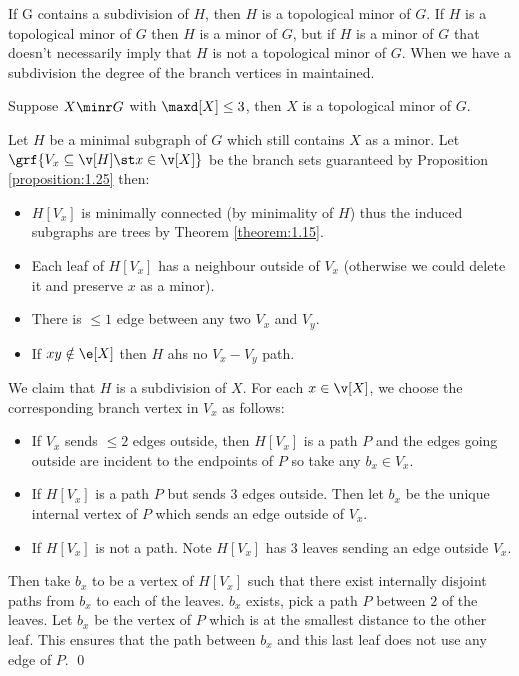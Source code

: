 If G contains a subdivision of $H$, then $H$ is a topological minor of $G$. If $H$ is a topological minor of $G$ then $H$ is a minor of $G$, but if $H$ is a minor of $G$ that doesn't necessarily imply that $H$ is not a topological minor of $G$. When we have a subdivision the degree of the branch vertices in maintained.
\begin{customproposition}{1.27}
    \label{proposition:1.27}
    Suppose $X \minr G$ with $\maxd[X] \leq 3$, then $X$ is a topological minor of $G$.
\end{customproposition}
\begin{prf}
    Let $H$ be a minimal subgraph of $G$ which still contains $X$ as a minor. Let $\grf{V_x \subseteq \v[H] \st x \in \v[X]}$ be the branch sets guaranteed by Proposition \ref{proposition:1.25} then:
    \begin{itemize}
        \item $H[V_x]$ is minimally connected (by minimality of $H$) thus the induced subgraphs are trees by Theorem \ref{theorem:1.15}.
        \item Each leaf of $H[V_x]$ has a neighbour outside of $V_x$ (otherwise we could delete it and preserve $x$ as a minor).
        \item There is $\leq 1$ edge between any two $V_x$ and $V_y$.
        \item If $xy \notin \e[X]$ then $H$ ahs no $V_x - V_y$ path.
    \end{itemize}
    We claim that $H$ is a subdivision of $X$. For each $x \in \v[X]$, we choose the corresponding branch vertex in $V_x$ as follows:
    \begin{itemize}
        \item If $V_x$ sends $\leq 2$ edges outside, then $H[V_x]$ is a path $P$ and the edges going outside are incident to the endpoints of $P$ so take any $b_x \in V_x$.
        \item If $H[V_x]$ is a path $P$ but sends $3$ edges outside. Then let $b_x$ be the unique internal vertex of $P$ which sends an edge outside of $V_x$.
        \item If $H[V_x]$ is not a path. Note $H[V_x]$ has $3$ leaves sending an edge outside $V_x.$
    \end{itemize}
    Then take $b_x$ to be a vertex of $H[V_x]$ such that there exist internally disjoint paths from $b_x$ to each of the leaves. $b_x$ exists, pick a path $P$ between $2$ of the leaves. Let $b_x$ be the vertex of $P$ which is at the smallest distance to the other leaf. This ensures that the path between $b_x$ and this last leaf does not use any edge of $P$. \qed
\end{prf}